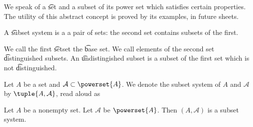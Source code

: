 
\sbasic











\sstart
{}


We speak of a \t{set} and a subset of its power set which satisfies certain properties.
The utility of this abstract concept is proved by its examples, in future sheets.


A \t{subset system} is a a pair of sets: the second set contains subsets of the first.

We call the first \t{set}{set} the \t{base set}.
We call elements of the second set \t{distinguished subsets}.
An \t{undistingished subset} is a subset of the first set which is not \t{distinguished}.



Let $A$ be a set and $\mathcal{A} \subset \powerset{A}$.
We denote the subset system of $A$ and $\mathcal{A}$
by $\tuple{A, \mathcal{A}}$, read aloud as 


\begin{expl}
Let $A$ be a nonempty set.
Let $\mathcal{A}$ be $\powerset{A}$.
Then $(A, \mathcal{A})$ is a subset system.
\end{expl}
\strats
